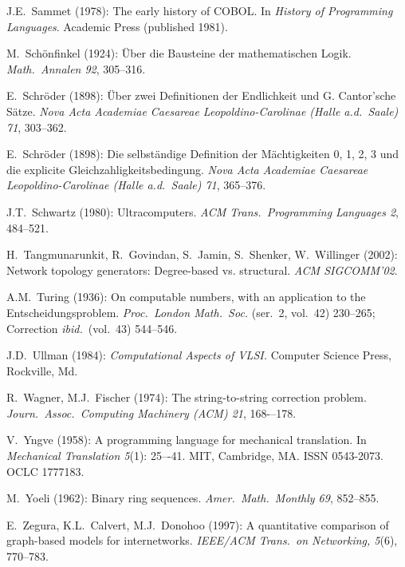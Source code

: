 \begin{thebibliography}{999}
J.E.~Sammet (1978):
The early history of COBOL.  In {\it History of Programming
  Languages}.  Academic Press (published 1981).

M.~Sch\"onfinkel (1924): \"{U}ber die Bausteine der mathematischen
Logik.  {\it Math.~Annalen 92}, 305--316.

E.~Schr\"{o}der (1898): \"{U}ber zwei Definitionen der Endlichkeit und
G. Cantor'sche S\"{a}tze.  {\it Nova Acta Academiae Caesareae
Leopoldino-Carolinae (Halle a.d.~Saale) 71}, 303--362.

E.~Schr\"{o}der (1898): Die selbst\"{a}ndige Definition der
M\"{a}chtigkeiten 0, 1, 2, 3 und die explicite
Gleichzahligkeitsbedingung.  {\it Nova Acta Academiae Caesareae
Leopoldino-Carolinae (Halle a.d.~Saale) 71}, 365--376.

J.T.~Schwartz (1980):
Ultracomputers.
{\it ACM Trans.~Programming Languages 2}, 484--521.



H.~Tangmunarunkit, R.~Govindan, S.~Jamin, S.~Shenker, W.~Willinger (2002):
Network topology generators: Degree-based vs.
structural.  {\it ACM SIGCOMM'02}.

A.M.~Turing (1936): On computable numbers, with an application to the
Entscheidungsproblem.  {\it Proc.~London Math.~Soc.} (ser.~2, vol.~42)
230--265; Correction {\it ibid.}~(vol.~43) 544--546.


J.D.~Ullman (1984):
{\it Computational Aspects of VLSI.}
Computer Science Press, Rockville, Md.



R.~Wagner, M.J.~Fischer (1974):
The string-to-string correction problem.
{\it Journ.~Assoc.~Computing Machinery (ACM) 21}, 168-–178.


V.~Yngve (1958): 
A programming language for mechanical translation.
In {\it Mechanical Translation 5}(1): 25–-41.  MIT, Cambridge, MA.
ISSN 0543-2073. OCLC 1777183.

M.~Yoeli (1962): Binary ring sequences.  {\it Amer.~Math.~Monthly 69},
852--855.


E.~Zegura, K.L.~Calvert, M.J.~Donohoo (1997):
A quantitative comparison of graph-based models for internetworks.
{\it IEEE/ACM Trans.~on Networking, 5}(6), 770--783.
\end{thebibliography}

